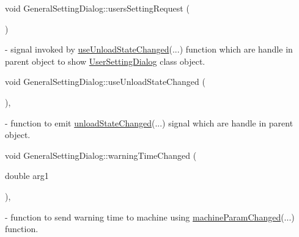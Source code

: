 \mbox{\label{classGeneralSettingDialog_a9bc417a43ff037b30e281e38fbc98744}} 
{\footnotesize\ttfamily void General\+Setting\+Dialog\+::\texorpdfstring{users\+Setting\+Request}{usersSettingRequest} (\begin{DoxyParamCaption}{ }\end{DoxyParamCaption}){\ttfamily [signal]}} - signal invoked by \hyperlink{classGeneralSettingDialog_acfb5eb53ac65d1aa5f037e88d91fa7e8}{use\+Unload\+State\+Changed}(...) function which are handle in parent object to show \hyperlink{classUserSettingDialog}{User\+Setting\+Dialog} class object.

\mbox{\label{classGeneralSettingDialog_acfb5eb53ac65d1aa5f037e88d91fa7e8}} 
{\footnotesize\ttfamily void General\+Setting\+Dialog\+::\texorpdfstring{use\+Unload\+State\+Changed}{useUnloadStateChanged} (\begin{DoxyParamCaption}{ }\end{DoxyParamCaption}){\ttfamily [private]}, {\ttfamily [slot]}} - function to emit \hyperlink{classGeneralSettingDialog_a3ec05b9d5bf741008ba575d408af6c04}{unload\+State\+Changed}(...) signal which are handle in parent object.

\mbox{\label{classGeneralSettingDialog_a9b1d7ada4c3dccc4c3a516b69dd714b9}} 
{\footnotesize\ttfamily void General\+Setting\+Dialog\+::\texorpdfstring{warning\+Time\+Changed}{warningTimeChanged} (\begin{DoxyParamCaption}\item[{double}]{arg1 }\end{DoxyParamCaption}){\ttfamily [private]}, {\ttfamily [slot]}} - function to send warning time to machine using \hyperlink{classGeneralSettingDialog_a02019fb6d81fc0e83ed6ae0ef7ef68b4}{machine\+Param\+Changed}(...) function.

